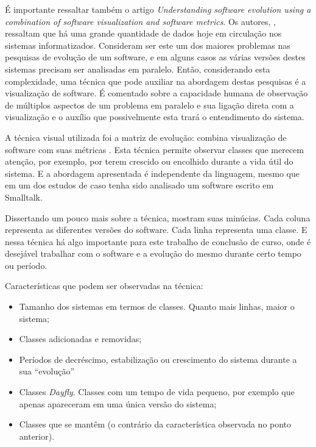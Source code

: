 É importante ressaltar também o artigo \textit{Understanding software evolution
using a combination of software visualization and software metrics}. Os
autores, , ressaltam que há uma grande
quantidade de dados hoje em circulação nos sistemas informatizados. Consideram ser este um
dos maiores problemas nas pesquisas de evolução de um software, e em alguns
casos as várias versões destes sistemas precisam ser analisadas em paralelo.
Então, considerando esta complexidade, uma técnica que pode auxiliar na
abordagem destas pesquisas é a visualização de software. É comentado sobre a
capacidade humana de observação de múltiplos aspectos de um problema em
paralelo e sua ligação direta com a visualização e o auxílio que possivelmente
esta trará o entendimento do sistema.

A técnica visual utilizada foi a matriz de evolução: combina visualização de
software com suas métricas \cite{lanza2001evolution}. Esta técnica permite
observar classes que merecem atenção, por exemplo, por terem crescido ou
encolhido durante a vida útil do sistema. E a abordagem apresentada é
independente da linguagem, mesmo que em um dos estudos de caso tenha sido
analisado um software escrito em Smalltalk.

Dissertando um pouco mais sobre a técnica, 
mostram suas minúcias. Cada coluna representa as diferentes versões do
software. Cada linha representa uma classe. E nessa técnica há algo importante
para este trabalho de conclusão de curso, onde é desejável trabalhar com o
software e a evolução do mesmo durante certo tempo ou período.

Características que podem ser observadas na técnica:

\begin{itemize}
  \item Tamanho dos sistemas em termos de classes. Quanto mais linhas, maior o
  sistema;
  \item Classes adicionadas e removidas;
  \item Períodos de decréscimo, estabilização ou crescimento do sistema durante a
  sua ``evolução''
  \item Classes \textit{Dayfly}. Classes com um tempo de vida pequeno, por
  exemplo que apenas apareceram em uma única versão do sistema;
  \item Classes que se mantêm (o contrário da característica observada no ponto
  anterior).
\end{itemize}

